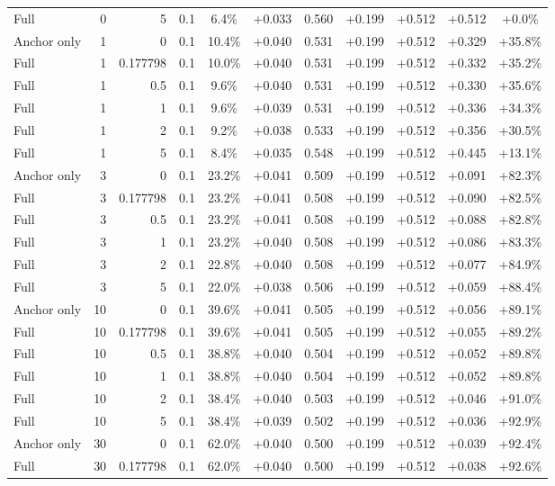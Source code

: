 \begin{table}[htbp]
\begin{tabular}{lrrrccccccc}
Full & 0 & 5 & 0.1 & 6.4\% & +0.033 & 0.560 & +0.199 & +0.512 & +0.512 & +0.0\% \\
Anchor only & 1 & 0 & 0.1 & 10.4\% & +0.040 & 0.531 & +0.199 & +0.512 & +0.329 & +35.8\% \\
Full & 1 & 0.177798 & 0.1 & 10.0\% & +0.040 & 0.531 & +0.199 & +0.512 & +0.332 & +35.2\% \\
Full & 1 & 0.5 & 0.1 & 9.6\% & +0.040 & 0.531 & +0.199 & +0.512 & +0.330 & +35.6\% \\
Full & 1 & 1 & 0.1 & 9.6\% & +0.039 & 0.531 & +0.199 & +0.512 & +0.336 & +34.3\% \\
Full & 1 & 2 & 0.1 & 9.2\% & +0.038 & 0.533 & +0.199 & +0.512 & +0.356 & +30.5\% \\
Full & 1 & 5 & 0.1 & 8.4\% & +0.035 & 0.548 & +0.199 & +0.512 & +0.445 & +13.1\% \\
Anchor only & 3 & 0 & 0.1 & 23.2\% & +0.041 & 0.509 & +0.199 & +0.512 & +0.091 & +82.3\% \\
Full & 3 & 0.177798 & 0.1 & 23.2\% & +0.041 & 0.508 & +0.199 & +0.512 & +0.090 & +82.5\% \\
Full & 3 & 0.5 & 0.1 & 23.2\% & +0.041 & 0.508 & +0.199 & +0.512 & +0.088 & +82.8\% \\
Full & 3 & 1 & 0.1 & 23.2\% & +0.040 & 0.508 & +0.199 & +0.512 & +0.086 & +83.3\% \\
Full & 3 & 2 & 0.1 & 22.8\% & +0.040 & 0.508 & +0.199 & +0.512 & +0.077 & +84.9\% \\
Full & 3 & 5 & 0.1 & 22.0\% & +0.038 & 0.506 & +0.199 & +0.512 & +0.059 & +88.4\% \\
Anchor only & 10 & 0 & 0.1 & 39.6\% & +0.041 & 0.505 & +0.199 & +0.512 & +0.056 & +89.1\% \\
Full & 10 & 0.177798 & 0.1 & 39.6\% & +0.041 & 0.505 & +0.199 & +0.512 & +0.055 & +89.2\% \\
Full & 10 & 0.5 & 0.1 & 38.8\% & +0.040 & 0.504 & +0.199 & +0.512 & +0.052 & +89.8\% \\
Full & 10 & 1 & 0.1 & 38.8\% & +0.040 & 0.504 & +0.199 & +0.512 & +0.052 & +89.8\% \\
Full & 10 & 2 & 0.1 & 38.4\% & +0.040 & 0.503 & +0.199 & +0.512 & +0.046 & +91.0\% \\
Full & 10 & 5 & 0.1 & 38.4\% & +0.039 & 0.502 & +0.199 & +0.512 & +0.036 & +92.9\% \\
Anchor only & 30 & 0 & 0.1 & 62.0\% & +0.040 & 0.500 & +0.199 & +0.512 & +0.039 & +92.4\% \\
Full & 30 & 0.177798 & 0.1 & 62.0\% & +0.040 & 0.500 & +0.199 & +0.512 & +0.038 & +92.6\% \\

\end{tabular}
\end{table}
